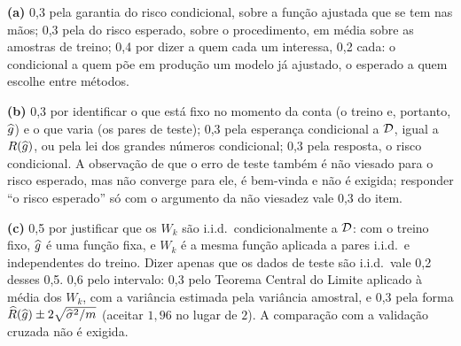 \documentclass[11pt,a4paper]{article}
\begin{document}



\begin{criterio}
\textbf{(a)} 0,3 pela garantia do risco condicional, sobre a função ajustada que se tem
nas mãos; 0,3 pela do risco esperado, sobre o procedimento, em média sobre as amostras de
treino; 0,4 por dizer a quem cada um interessa, 0,2 cada: o condicional a quem põe em
produção um modelo já ajustado, o esperado a quem escolhe entre métodos.

\textbf{(b)} 0,3 por identificar o que está fixo no momento da conta (o treino e,
portanto, $\widehat{g}$) e o que varia (os pares de teste); 0,3 pela esperança condicional a
$\mathcal{D}$, igual a $R(\widehat{g})$, ou pela lei dos grandes números condicional; 0,3 pela
resposta, o risco condicional. A observação de que o erro de teste também é não viesado
para o risco esperado, mas não converge para ele, é bem-vinda e não é exigida; responder
``o risco esperado'' só com o argumento da não viesadez vale 0,3 do item.

\textbf{(c)} 0,5 por justificar que os $W_k$ são i.i.d.\ condicionalmente a $\mathcal{D}$: com
o treino fixo, $\widehat{g}$ é uma função fixa, e $W_k$ é a mesma função aplicada a pares i.i.d.\
e independentes do treino. Dizer apenas que os dados de teste são i.i.d.\ vale 0,2 desses
0,5. 0,6 pelo intervalo: 0,3 pelo Teorema Central do Limite aplicado à média dos $W_k$,
com a variância estimada pela variância amostral, e 0,3 pela forma
$\widehat{R}(\widehat{g})\pm2\sqrt{\widehat\sigma^2/m}$ (aceitar $1{,}96$ no lugar de $2$). A
comparação com a validação cruzada não é exigida.
\end{criterio}
\end{document}
